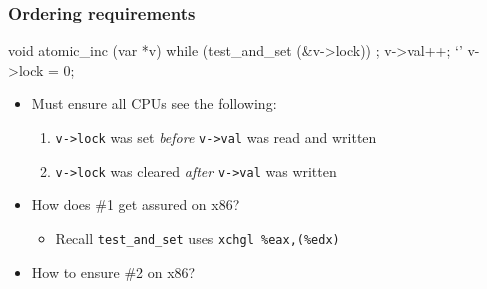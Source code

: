 \documentclass[11pt,aspectratio=169]{beamer}
\begin{document}
\begin{frame}[fragile]
\frametitle{Ordering requirements}
\begin{ccode}
    void atomic_inc (var *v) {
      while (test_and_set (&v->lock))
        ;
      v->val++;
      `'
      v->lock = 0;
    }
\end{ccode}
\begin{itemize}
  \item Must ensure all CPUs see the following:
  \begin{enumerate}
    \item \texttt{v->lock} was set \emph{before} \texttt{v->val}
      was read and written
    \item \texttt{v->lock} was cleared \emph{after} \texttt{v->val}
      was written
  \end{enumerate}
  \item How does \#1 get assured on x86?
  \begin{itemize}
    \item Recall \verb+test_and_set+ uses \verb+xchgl %eax,(%edx)+
  \end{itemize}
  \item How to ensure \#2 on x86?
  \begin{itemize}
  \end{itemize}
\end{itemize}
\end{frame}
\end{document}
